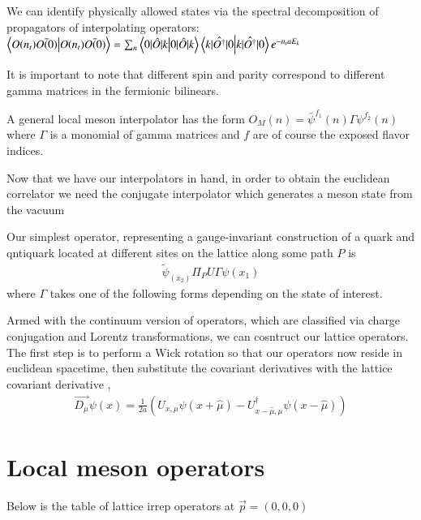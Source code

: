 We can identify physically allowed states via the spectral decomposition of propagators of interpolating operators: 
$\braket{O(n_t)\bar{O(0)}} = \sum_{n}\braket{0|\hat{O}|k} \braket{k|\hat{O^{\dagger}}|0} e^{-n_taE_k}$

It is important to note that different spin and parity correspond to different gamma matrices in the fermionic bilinears. 

A general local meson interpolator has the form $O_M(n) = \bar{\psi}^{f_1}(n)\Gamma\psi^{f_2}(n)$ where $\Gamma$ is a monomial of gamma matrices and $f$ are of course the exposed flavor indices. 

Now that we have our interpolators in hand, in order to obtain the euclidean correlator we need the conjugate interpolator which generates a meson state from the vacuum 

Our simplest operator, representing a gauge-invariant construction of a quark and qntiquark located at different sites on the lattice along some path $P$ is 
\begin{align}
    \tilde{\psi}_(x_2)\Pi_P U \Gamma \psi(x_1)
\end{align}
where $\Gamma$ takes one of the following forms depending on the state of interest. 

Armed with the continuum version of operators, which are classified via charge conjugation and Lorentz transformations, we can cosntruct our lattice operators. The first step is to perform a Wick rotation so that our operators now reside in euclidean spacetime, then substitute the covariant derivatives with the lattice covariant derivative \cite{G_ckeler_1996}, 
\begin{align}
    \overrightarrow{D_\mu}\psi(x) = \frac{1}{2a}(U_{x,\mu}\psi(x + \hat{\mu}) - U_{x-\hat{\mu},\mu}^\dagger\psi(x - \hat{\mu}))
\end{align}

\section{Local meson operators}
Below is the table of lattice irrep operators at $\vec{p} = (0,0,0)$ \cite{Dudek_2008}

